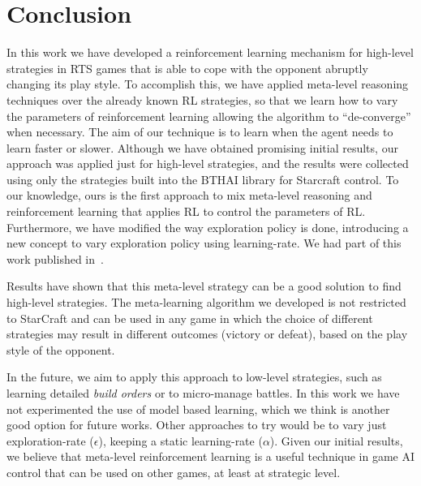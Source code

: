 \chapter{Conclusion}
\label{chapter:conclusion}

In this work we have developed a reinforcement learning mechanism for high-level strategies in RTS games that is able to cope with the opponent abruptly changing its play style.
To accomplish this, we have applied meta-level reasoning techniques over the already known RL strategies, so that we learn how to vary the parameters of reinforcement learning allowing the algorithm to ``de-converge'' when necessary.
The aim of our technique is to learn when the agent needs to learn faster or slower. 
Although we have obtained promising initial results, our approach was applied just for high-level strategies, and the results were collected using only the strategies built into the BTHAI library for Starcraft control.
To our knowledge, ours is the first approach to mix meta-level reasoning and reinforcement learning that applies RL to control the parameters of RL.
Furthermore, we have modified the way exploration policy is done, introducing a new concept to vary exploration policy using learning-rate.
We had part of this work published in~\cite{mypaper}.

Results have shown that this meta-level strategy can be a good solution to find high-level strategies.
The meta-learning algorithm we developed is not restricted to StarCraft and can be used in any game in which the choice of different strategies may result in different outcomes (victory or defeat), based on the play style of the opponent. 

In the future, we aim to apply this approach to low-level strategies, such as learning detailed \textit{build orders} or to micro-manage battles.
In this work we have not experimented the use of model based learning, which we think is another good option for future works.
Other approaches to try would be to vary just exploration-rate ($\epsilon$), keeping a static learning-rate ($\alpha$).
Given our initial results, we believe that meta-level reinforcement learning is a useful technique in game AI control that can be used on other games, at least at strategic level.